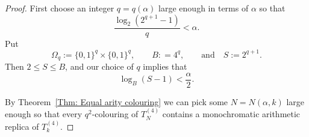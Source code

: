 \documentclass[11pt]{amsart}
\renewcommand{\leq}{\leqslant}
\theoremstyle{plain}
\theoremstyle{definition}
\theoremstyle{remark}
\begin{document}
\begin{proof}
First choose an integer $q=q(\alpha)$ large enough in terms of $\alpha$ so that
\begin{equation}
\frac{\log_2(2^{q+1}-1)}{q} < \alpha.
\end{equation} 
Put
\[ \Omega_q:= \{0,1\}^q \times \{0,1\}^q, \qquad B: = 4^q, \qquad \text{and}\quad S:=2^{q+1}.\]
Then $2\leq S \leq B$, and our choice of $q$ implies that
\begin{equation}\label{eq: condition letting us pick gamma}
 \log_B(S-1) < \frac{\alpha}{2}.
 \end{equation}

By Theorem~\ref{Thm: Equal arity colouring} we can pick some $N=N(\alpha,k)$ large enough so that every $q^2$-colouring of $T_N^{(4)}$ contains a monochromatic arithmetic replica of $T_k^{(4)}$.


\end{proof}
\end{document}
